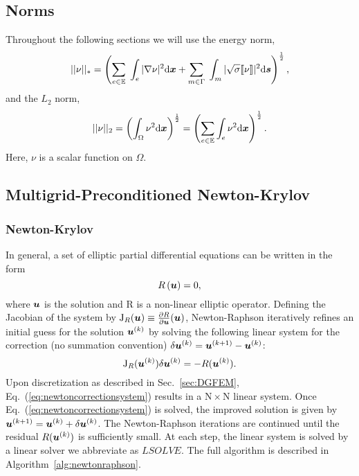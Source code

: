 \subsection{Norms}


Throughout the following sections we will use the energy norm,
  \begin{equation}
  \label{eq:energynorm}
 ||\nu||_{*} = \left(\sum_{\substack{e \in \mathbb{E}}}\; \int_e |\nabla \nu |^{2} \mathrm{d}\boldsymbol{x} + \sum\limits_{m \in \Gamma}\; \int_m|\sqrt{\sigma} \llbracket \nu \rrbracket |^{2} \mathrm{d} \boldsymbol{s} \right)^{\frac{1}{2}},
 \end{equation}
and the $L_2$ norm,
 \begin{equation}
  \label{eq:l2norm}
  ||\nu||_{2}
  = \left(\int_{\Omega}\nu^2\mathrm{d}\boldsymbol{x}\right)^{\frac{1}{2}} 
 = \left(\sum_{\substack{e \in \mathbb{E}}}
  \int_{e}\nu^2\mathrm{d}\boldsymbol{x}\right)^{\frac{1}{2}}.
\end{equation}
Here, $\nu$ is a scalar function on $\Omega$.

\subsection{Multigrid-Preconditioned Newton-Krylov}

\subsubsection{Newton-Krylov}

In general, a set of elliptic partial differential equations can be written in the form
%
\begin{equation}\label{eq:Ru=0}
  R\left(\boldsymbol{u} \right) = 0,
\end{equation}
%
where $\boldsymbol{u}$ is the solution and R is a non-linear elliptic operator.
Defining the Jacobian of the system by
%
$\mathrm{J}_{R}(\boldsymbol{u}) \equiv \frac{\partial R}{\partial \boldsymbol{u}}(\boldsymbol{u})$,
%
Newton-Raphson iteratively refines an initial guess for the solution
$\boldsymbol{u}^{(k)}$ by solving the following 
linear system for the correction (no summation convention) $\delta \boldsymbol{u}^{(k)} = \boldsymbol{u}^{(k+1)} -
\boldsymbol{u}^{(k)}$:
%
\begin{equation}
\label{eq:newtoncorrectionsystem}
\mathrm{J}_R(\boldsymbol{u}^{(k)})\delta \boldsymbol{u}^{(k)} = -R(\boldsymbol{u}^{(k)}).
\end{equation}
%
Upon discretization as described in Sec.~\ref{sec:DGFEM}, Eq.~(\ref{eq:newtoncorrectionsystem}) results in
  a $\mathrm{N} \times \mathrm{N}$ linear system.
Once Eq.~(\ref{eq:newtoncorrectionsystem}) is solved, the improved solution is given by $\boldsymbol{u}^{(k+1)}=\boldsymbol{u}^{(k)}+\delta \boldsymbol{u}^{(k)}$.
  The Newton-Raphson iterations are continued until the residual $R(\boldsymbol{u}^{(k)})$ is sufficiently small. At each step, the linear system is solved by a linear solver we abbreviate as $LSOLVE$. The full algorithm is described in Algorithm~\ref{alg:newtonraphson}.

